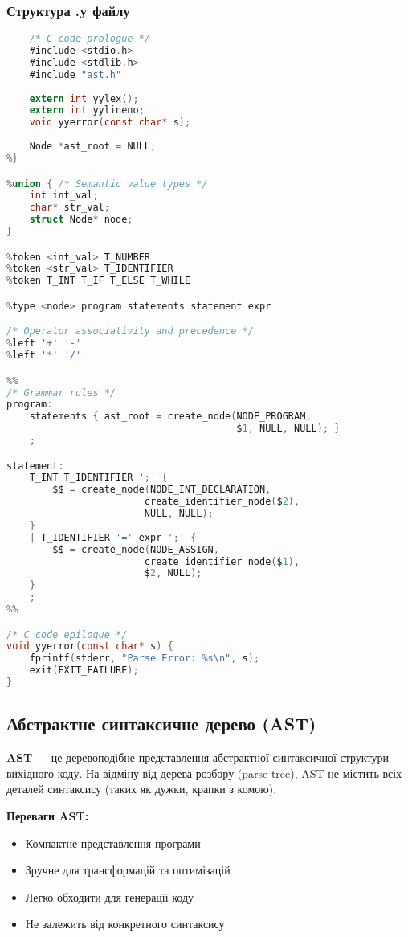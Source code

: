 \documentclass[12pt,a4paper]{article}
\begin{document}
\subsubsection{Структура .y файлу}

\begin{lstlisting}[language=C]
%{
    /* C code prologue */
    #include <stdio.h>
    #include <stdlib.h>
    #include "ast.h"
    
    extern int yylex();
    extern int yylineno;
    void yyerror(const char* s);
    
    Node *ast_root = NULL;
%}

%union { /* Semantic value types */ 
    int int_val;
    char* str_val;
    struct Node* node;
}

%token <int_val> T_NUMBER
%token <str_val> T_IDENTIFIER
%token T_INT T_IF T_ELSE T_WHILE

%type <node> program statements statement expr

/* Operator associativity and precedence */
%left '+' '-'
%left '*' '/'

%%
/* Grammar rules */
program:
    statements { ast_root = create_node(NODE_PROGRAM, 
                                        $1, NULL, NULL); }
    ;

statement:
    T_INT T_IDENTIFIER ';' { 
        $$ = create_node(NODE_INT_DECLARATION, 
                        create_identifier_node($2), 
                        NULL, NULL); 
    }
    | T_IDENTIFIER '=' expr ';' { 
        $$ = create_node(NODE_ASSIGN, 
                        create_identifier_node($1), 
                        $2, NULL); 
    }
    ;
%%

/* C code epilogue */
void yyerror(const char* s) {
    fprintf(stderr, "Parse Error: %s\n", s);
    exit(EXIT_FAILURE);
}
\end{lstlisting}

\subsection{Абстрактне синтаксичне дерево (AST)}

\textbf{AST} --- це деревоподібне представлення абстрактної синтаксичної структури вихідного коду. На відміну від дерева розбору (parse tree), AST не містить всіх деталей синтаксису (таких як дужки, крапки з комою).

\textbf{Переваги AST:}
\begin{itemize}
    \item Компактне представлення програми
    \item Зручне для трансформацій та оптимізацій
    \item Легко обходити для генерації коду
    \item Не залежить від конкретного синтаксису
\end{itemize}
\end{document}
